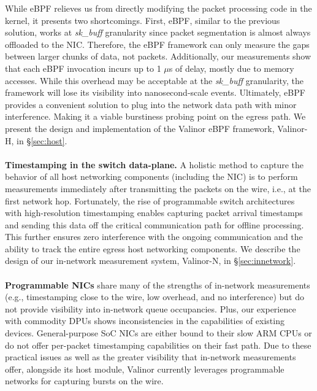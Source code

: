 While eBPF relieves us from directly modifying the packet processing code in the kernel, it presents two shortcomings. First, eBPF, similar to the previous solution, works at \textit{sk\_buff} granularity since packet segmentation is almost always offloaded to the NIC. Therefore, the eBPF framework can only measure the gaps between larger chunks of data, not packets. Additionally, our measurements show that each eBPF invocation incurs  up to 1 $\mu$s of delay, mostly due to memory accesses. While this overhead may be acceptable at the \textit{sk\_buff} granularity, the framework will lose its visibility into nanosecond-scale events. Ultimately, eBPF provides a convenient solution to plug into the network data path with minor interference. Making it a viable burstiness probing point on the egress path. We present the design and implementation of the Valinor eBPF framework, Valinor-H, in \S\ref{sec:host}.
\\
\\
\textbf{Timestamping in the switch data-plane.}
A holistic method to capture the behavior of all host networking components (including the NIC) is to perform measurements immediately after transmitting the packets on the wire, i.e., at the first network hop. Fortunately, the rise of programmable switch architectures with high-resolution timestamping enables capturing packet arrival timestamps and sending this data off the critical communication path for offline processing.
This further ensures zero interference with the ongoing communication and the ability to track the entire egress host networking components. We describe the design of our in-network measurement system, Valinor-N, in \S\ref{sec:innetwork}. 
\\
\\
\textbf{Programmable NICs} share many of the strengths of in-network measurements (e.g., timestamping close to the wire, low overhead, and no interference) but do not provide visibility into in-network queue occupancies. Plus, our experience with commodity DPUs \cite{dpu} shows inconsistencies in the capabilities of existing devices. General-purpose SoC NICs \cite{dpu} are either bound to their slow ARM CPUs or do not offer per-packet timestamping capabilities on their fast path. Due to these practical issues as well as the greater visibility that in-network measurements offer, alongside its host module, Valinor currently leverages programmable networks for capturing bursts on the wire.

